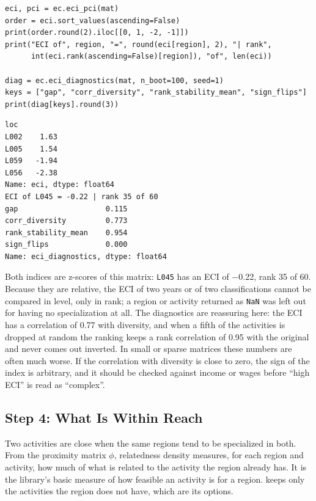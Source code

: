 \begin{lstlisting}
eci, pci = ec.eci_pci(mat)
order = eci.sort_values(ascending=False)
print(order.round(2).iloc[[0, 1, -2, -1]])
print("ECI of", region, "=", round(eci[region], 2), "| rank",
      int(eci.rank(ascending=False)[region]), "of", len(eci))

diag = ec.eci_diagnostics(mat, n_boot=100, seed=1)
keys = ["gap", "corr_diversity", "rank_stability_mean", "sign_flips"]
print(diag[keys].round(3))
\end{lstlisting}
\begin{lstlisting}[language={}, numbers=none, backgroundcolor=\color{white}, frame=leftline, framerule=2pt, rulecolor=\color{noteborder}, xleftmargin=1.5em]
loc
L002    1.63
L005    1.54
L059   -1.94
L056   -2.38
Name: eci, dtype: float64
ECI of L045 = -0.22 | rank 35 of 60
gap                    0.115
corr_diversity         0.773
rank_stability_mean    0.954
sign_flips             0.000
Name: eci_diagnostics, dtype: float64
\end{lstlisting}

Both indices are z-scores of this matrix: \texttt{L045} has an ECI
of $-$0.22, rank 35 of
60. Because they are relative, the ECI of two years or of two
classifications cannot be compared in level, only in rank; a region or
activity returned as \texttt{NaN} was left out for having no
specialization at all. The diagnostics are reassuring here: the ECI has
a correlation of 0.77 with diversity, and when a
fifth of the activities is dropped at random the ranking keeps a rank
correlation of 0.95 with the original and
never comes out inverted. In small or sparse matrices these numbers are
often much worse. If the correlation with diversity is close to zero,
the sign of the index is arbitrary, and it should be checked against
income or wages before ``high ECI'' is read as ``complex''.

\subsection{Step 4: What Is Within Reach}

Two activities are close when the same regions tend to be
specialized in both. From the proximity matrix $\phi$, relatedness
density measures, for each region and activity, how much of what is
related to the activity the region already has. It is the library's
basic measure of how feasible an activity is for a region.
 keeps only the activities the region
does not have, which are its options.


